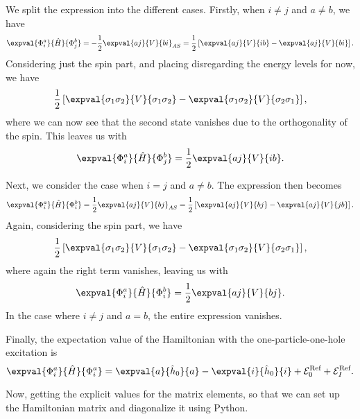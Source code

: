 We split the expression into the different cases.
Firstly, when $i \neq j$ and $a \neq b$, we have
\begin{equation*}
    \expval{\Phi_i^a}{\hat{H}}{\Phi_j^b} = -\frac{1}{2} \expval{aj}{V}{bi}_{AS} = \frac{1}{2} \left[ \expval{aj}{V}{ib} - \expval{aj}{V}{bi} \right].
\end{equation*}
Considering just the spin part, and placing disregarding the energy levels for now, we have
\begin{equation*}
    \frac{1}{2} \left[ \expval{\sigma_1 \sigma_2}{V}{\sigma_1 \sigma_2} - \expval{\sigma_1 \sigma_2}{V}{\sigma_2 \sigma_1} \right],
\end{equation*}
where we can now see that the second state vanishes due to the orthogonality of the spin. %
This leaves us with
\begin{equation*}
    \expval{\Phi_i^a}{\hat{H}}{\Phi_j^b} = \frac{1}{2} \expval{aj}{V}{ib}.
\end{equation*}

Next, we consider the case when $i = j$ and $a \neq b$.
The expression then becomes
\begin{equation*}
    \expval{\Phi_i^a}{\hat{H}}{\Phi_i^b} = \frac{1}{2} \expval{aj}{V}{bj}_{AS} = \frac{1}{2} \left[ \expval{aj}{V}{bj} - \expval{aj}{V}{jb} \right].
\end{equation*}
Again, considering the spin part, we have
\begin{equation*}
    \frac{1}{2} \left[ \expval{\sigma_1 \sigma_2}{V}{\sigma_1 \sigma_2} - \expval{\sigma_1 \sigma_2}{V}{\sigma_2 \sigma_1} \right],
\end{equation*}
where again the right term vanishes, leaving us with
\begin{equation*}
    \expval{\Phi_i^a}{\hat{H}}{\Phi_i^b} = \frac{1}{2} \expval{aj}{V}{bj}.
\end{equation*}
In the case where $i \neq j$ and $a = b$, the entire expression vanishes.

Finally, the expectation value of the Hamiltonian with the one-particle-one-hole excitation is
\begin{equation}\label{eq:1p1h-1p1h-final}
    \expval{\Phi_i^a}{\hat{H}}{\Phi_i^a} = \expval{a}{\hat{h}_0}{a} - \expval{i}{\hat{h}_0}{i} + \mathcal{E}_0^{\text{Ref}} + \mathcal{E}_I^{\text{Ref}}.
\end{equation}

Now, getting the explicit values for the matrix elements, so that we can set up the Hamiltonian matrix and diagonalize it using Python.

